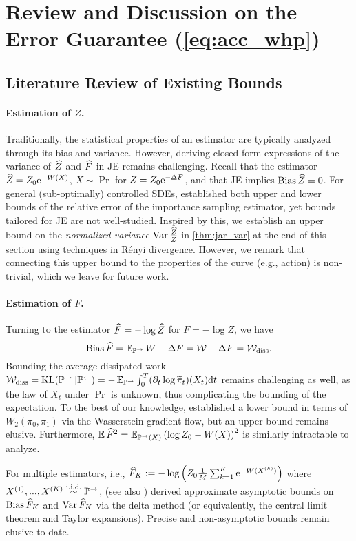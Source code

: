 \section{Review and Discussion on the Error Guarantee (\cref{eq:acc_whp})}
\label{app:guarantee}
\subsection{Literature Review of Existing Bounds}
\paragraph{Estimation of $Z$.} Traditionally, the statistical properties of an estimator are typically analyzed through its bias and variance. However, deriving closed-form expressions of the variance of $\widehat{Z}$ and $\widehat{F}$ in JE remains challenging. Recall that the estimator $\widehat{Z}=Z_0\mathrm{e}^{-W(X)}$, $X\sim\Pr$ for $Z=Z_0\mathrm{e}^{-\Delta F}$, and that JE implies $\operatorname{Bias}\widehat{Z}=0$. For general (sub-optimally) controlled SDEs, \cite{hartmann2024nonasymptotic} established both upper and lower bounds of the relative error of the importance sampling estimator, yet bounds tailored for JE are not well-studied. Inspired by this, we establish an upper bound on the \emph{normalized variance} $\operatorname{Var}\frac{\widehat{Z}}{Z}$ in \cref{thm:jar_var} at the end of this section using techniques in R\'enyi divergence. However, we remark that connecting this upper bound to the properties of the curve (e.g., action) is non-trivial, which we leave for future work. 

\paragraph{Estimation of $F$.} Turning to the estimator $\widehat{F}=-\log\widehat{Z}$ for $F=-\log Z$, we have
$$\operatorname{Bias}\widehat{F}=\operatorname{\mathbb{E}}_{\mathbb{P}^\to}W-\Delta F=\mathcal{W}-\Delta F=\mathcal{W}_\mathrm{diss}.$$
Bounding the average dissipated work $\mathcal{W}_\mathrm{diss}=\operatorname{KL}(\mathbb{P}^\to\|\mathbb{P}^\gets)=-\operatorname{\mathbb{E}}_{\mathbb{P}^\to}\int_0^T(\partial_t\log\widetilde{\pi}_t)(X_t)\mathrm{d} t$ remains challenging as well, as the law of $X_t$ under $\Pr$ is unknown, thus complicating the bounding of the expectation. To the best of our knowledge, \cite{chen2020stochastic} established a lower bound in terms of $W_2(\pi_0,\pi_1)$ via the Wasserstein gradient flow, but an upper bound remains elusive. Furthermore, $\operatorname{\mathbb{E}}\widehat{F}^2=\operatorname{\mathbb{E}}_{\mathbb{P}^\to(X)}\left(\log Z_0-W(X)\right)^2$ is similarly intractable to analyze. 

For multiple estimators, i.e., $\widehat{F}_K:=-\log\left(Z_0\frac{1}{M}\sum_{k=1}^K\mathrm{e}^{-W(X^{(k)})}\right)$ where $X^{(1)},...,X^{(K)}\stackrel{\mathrm{i.i.d.}}{\sim}\mathbb{P}^\to$, \cite{zuckerman2002theory,zuckerman2004systematic} (see also \citet[Sec. 4.1.5]{lelievre2010free}) derived approximate asymptotic bounds on $\operatorname{Bias}\widehat{F}_K$ and $\operatorname{Var}\widehat{F}_K$ via the delta method (or equivalently, the central limit theorem and Taylor expansions). Precise and non-asymptotic bounds remain elusive to date.

